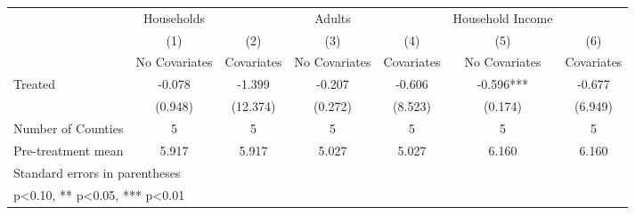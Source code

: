 {
\def\sym#1{\ifmmode^{#1}\else\(^{#1}\)\fi}
\begin{tabular}{l*{6}{c}}
\hline\hline
            &  Households   &               &      Adults   &               &Household Income   &               \\
            &\multicolumn{1}{c}{(1)}&\multicolumn{1}{c}{(2)}&\multicolumn{1}{c}{(3)}&\multicolumn{1}{c}{(4)}&\multicolumn{1}{c}{(5)}&\multicolumn{1}{c}{(6)}\\
            &\multicolumn{1}{c}{No Covariates}&\multicolumn{1}{c}{Covariates}&\multicolumn{1}{c}{No Covariates}&\multicolumn{1}{c}{Covariates}&\multicolumn{1}{c}{No Covariates}&\multicolumn{1}{c}{Covariates}\\
\hline
Treated     &      -0.078   &      -1.399   &      -0.207   &      -0.606   &      -0.596***&      -0.677   \\
            &     (0.948)   &    (12.374)   &     (0.272)   &     (8.523)   &     (0.174)   &     (6.949)   \\
\hline
Number of Counties&           5   &           5   &           5   &           5   &           5   &           5   \\
Pre-treatment mean&       5.917   &       5.917   &       5.027   &       5.027   &       6.160   &       6.160   \\
\hline\hline
\multicolumn{7}{l}{\footnotesize Standard errors in parentheses}\\
\multicolumn{7}{l}{\footnotesize * p<0.10, ** p<0.05, *** p<0.01}\\
\end{tabular}
}
